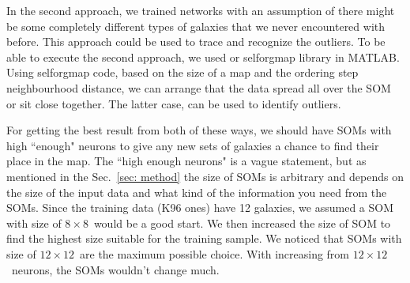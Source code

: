 \documentclass[useAMS,usenatbib]{mn2e}
\begin{document}
    In the second approach, we trained networks with an assumption of there might be some completely different types of galaxies that we never encountered with before.
    This approach could be used to trace and recognize the outliers.
    To be able to execute the second approach, we used or {\tiny selforgmap} library in {\tiny MATLAB}.
    Using {\tiny selforgmap} code, based on the size of a map and the ordering step neighbourhood distance, we can arrange that the data spread all over the SOM or sit close together.
    The latter case, can be used to identify outliers. 

    For getting the best result from both of these ways, we should have SOMs with high ``enough"  neurons to give any new sets of galaxies a chance to find their place in the map.
    The  ``high enough  neurons" is a vague statement, but as mentioned in the Sec.~\ref{sec: method} the size of SOMs is arbitrary and depends on the size of the input data and what kind of the information you need from the SOMs. %
    Since the training data (K96 ones) have 12 galaxies, we assumed a SOM with size of $8\times8$~would be a good start.
    We then increased the size of SOM to find the highest size suitable for the training sample.
    We noticed that SOMs with size of $12\times12$~are the maximum possible choice.
    With increasing from $12\times12$~neurons, the SOMs wouldn't change much.
    
\end{document}
